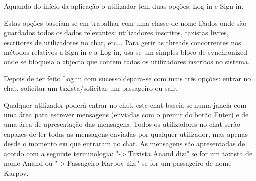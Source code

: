 Aquando do início da aplicação o utilizador tem duas opções: Log in e Sign in.

Estas opções baseiam-se em trabalhar com uma classe de nome Dados onde são guardados todos os dados relevantes: utilizadores inscritos, taxistas livres, escritores de utilizadores no chat, etc... Para gerir as threads concorrentes nos métodos relativos a Sign in e a Log in, usa-se um simples bloco de synchronized onde se bloqueia o objecto que contém todos os utilizadores inscritos no sistema.

Depois de ter feito Log in com sucesso depara-se com mais três opções: entrar no chat, solicitar um taxista/solicitar um passageiro ou sair. 

Qualquer utilizador poderá entrar no chat. este chat baseia-se numa janela com uma área para escrever mensagens (enviadas com o premir do botão Enter) e de uma área de apresentação das mensagens. Todos os utilizadores no chat serão capazes de ler todas as mensagens enviadas por qualquer utilizador, mas apenas desde o momento em que entraram no chat. As mensagens são apresentadas de acordo com a seguinte terminologia: "-> Taxista Anand diz:" se for um taxista de nome Anand ou "-> Passageiro Karpov diz:" se for um passageiro de nome Karpov.

